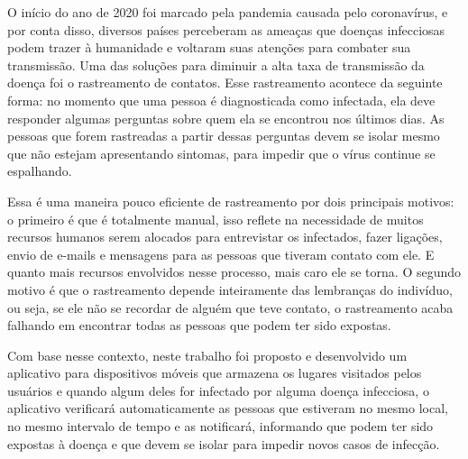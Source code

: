 \documentclass[Portugues,Draft]{tese-FT}
\begin{document}
\begin{resumo}
O início do ano de 2020 foi marcado pela pandemia causada pelo coronavírus, e por conta disso, diversos países perceberam as ameaças que doenças infecciosas podem trazer à humanidade e voltaram suas atenções para combater sua transmissão. 
Uma das soluções para diminuir a alta taxa de transmissão da doença foi o rastreamento de contatos. Esse rastreamento acontece da seguinte forma: no momento que uma pessoa é diagnosticada como infectada, ela deve responder algumas perguntas sobre quem ela se encontrou nos últimos dias. As pessoas que forem rastreadas a partir dessas perguntas devem se isolar mesmo que não estejam apresentando sintomas, para impedir que o vírus continue se espalhando.

Essa é uma maneira pouco eficiente de rastreamento por dois principais motivos: o primeiro é que é totalmente manual, isso reflete na necessidade de muitos recursos humanos serem alocados para entrevistar os infectados, fazer ligações, envio de e-mails e mensagens para as pessoas que tiveram contato com ele. E quanto mais recursos envolvidos nesse processo, mais caro ele se torna. O segundo motivo é que o rastreamento depende inteiramente das lembranças do indivíduo, ou seja, se ele não se recordar de alguém que teve contato, o rastreamento acaba falhando em encontrar todas as pessoas que podem ter sido expostas.

Com base nesse contexto, neste trabalho foi proposto e desenvolvido um aplicativo para dispositivos móveis que armazena os lugares visitados pelos usuários e quando algum deles for infectado por alguma doença infecciosa, o aplicativo verificará automaticamente as pessoas que estiveram no mesmo local, no mesmo intervalo de tempo e as notificará, informando que podem ter sido expostas à doença e que devem se isolar para impedir novos casos de infecção.
\end{resumo}
\end{document}
